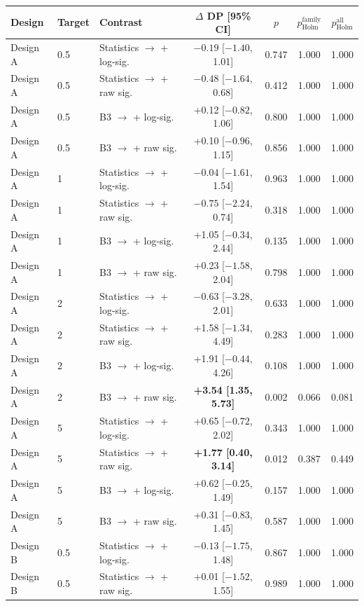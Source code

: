 \begin{tabular}{@{}lllcccc@{}}
\toprule
Design & Target & Contrast & $\Delta$ DP [95\% CI] & $p$ & $p_{\mathrm{Holm}}^{\mathrm{family}}$ & $p_{\mathrm{Holm}}^{\mathrm{all}}$ \\
\midrule
Design A & 0.5 & Statistics $\to$ + log-sig. & $-0.19$ [$-1.40$, 1.01] & 0.747 & 1.000 & 1.000 \\
Design A & 0.5 & Statistics $\to$ + raw sig. & $-0.48$ [$-1.64$, 0.68] & 0.412 & 1.000 & 1.000 \\
Design A & 0.5 & B3 $\to$ + log-sig. & +0.12 [$-0.82$, 1.06] & 0.800 & 1.000 & 1.000 \\
Design A & 0.5 & B3 $\to$ + raw sig. & +0.10 [$-0.96$, 1.15] & 0.856 & 1.000 & 1.000 \\
Design A & 1 & Statistics $\to$ + log-sig. & $-0.04$ [$-1.61$, 1.54] & 0.963 & 1.000 & 1.000 \\
Design A & 1 & Statistics $\to$ + raw sig. & $-0.75$ [$-2.24$, 0.74] & 0.318 & 1.000 & 1.000 \\
Design A & 1 & B3 $\to$ + log-sig. & +1.05 [$-0.34$, 2.44] & 0.135 & 1.000 & 1.000 \\
Design A & 1 & B3 $\to$ + raw sig. & +0.23 [$-1.58$, 2.04] & 0.798 & 1.000 & 1.000 \\
Design A & 2 & Statistics $\to$ + log-sig. & $-0.63$ [$-3.28$, 2.01] & 0.633 & 1.000 & 1.000 \\
Design A & 2 & Statistics $\to$ + raw sig. & +1.58 [$-1.34$, 4.49] & 0.283 & 1.000 & 1.000 \\
Design A & 2 & B3 $\to$ + log-sig. & +1.91 [$-0.44$, 4.26] & 0.108 & 1.000 & 1.000 \\
Design A & 2 & B3 $\to$ + raw sig. & \textbf{\boldmath +3.54 [1.35, 5.73]} & 0.002 & 0.066 & 0.081 \\
Design A & 5 & Statistics $\to$ + log-sig. & +0.65 [$-0.72$, 2.02] & 0.343 & 1.000 & 1.000 \\
Design A & 5 & Statistics $\to$ + raw sig. & \textbf{\boldmath +1.77 [0.40, 3.14]} & 0.012 & 0.387 & 0.449 \\
Design A & 5 & B3 $\to$ + log-sig. & +0.62 [$-0.25$, 1.49] & 0.157 & 1.000 & 1.000 \\
Design A & 5 & B3 $\to$ + raw sig. & +0.31 [$-0.83$, 1.45] & 0.587 & 1.000 & 1.000 \\
Design B & 0.5 & Statistics $\to$ + log-sig. & $-0.13$ [$-1.75$, 1.48] & 0.867 & 1.000 & 1.000 \\
Design B & 0.5 & Statistics $\to$ + raw sig. & +0.01 [$-1.52$, 1.55] & 0.989 & 1.000 & 1.000 \\

\end{tabular}
